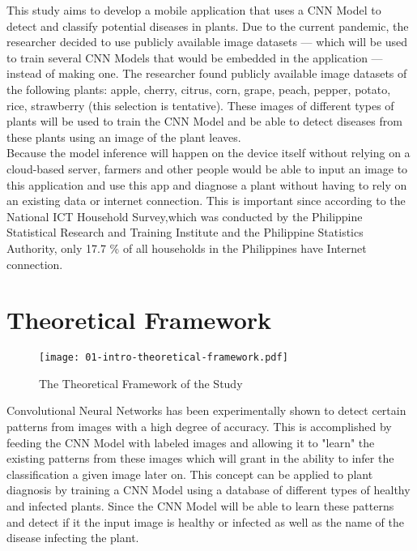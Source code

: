 
This study aims to develop a mobile application that uses a 
CNN Model  to detect and classify potential diseases in 
plants. Due to the current pandemic, the researcher decided to use publicly 
available image datasets — which will be used to train several CNN Models 
that would be embedded in the application — instead of making one. The researcher 
found publicly available image datasets of the following plants:
apple, cherry, citrus, corn, grape, peach, pepper, potato,
rice, strawberry (this selection is tentative). These images of different types 
of plants will be used to train the CNN Model and be able to detect diseases from 
these plants using an image of the plant leaves. \\ 

Because the model inference will
happen on the device itself without relying on a cloud-based server, 
farmers and other people would be able to input an image to this application 
and use this app and diagnose a plant without having to rely on an 
existing data or internet connection. This is important since according to 
the  National ICT Household Survey,which was conducted by the Philippine Statistical 
Research and Training Institute and the Philippine Statistics Authority, only 
17.7 \% of all households in the Philippines have Internet connection. 


\newpage 


\section{Theoretical Framework}

\begin{figure}[h!]
      \centering
      \texttt{[image: 01-intro-theoretical-framework.pdf]}
      \caption{The Theoretical Framework of the Study}
\end{figure}

Convolutional Neural Networks has been experimentally shown 
to detect certain patterns from images with a high degree of 
accuracy. This is accomplished 
by feeding the CNN Model with labeled images and allowing it to "learn"
the existing patterns from these images which will grant in the ability 
to infer the classification a given image later on. This concept 
can be applied to plant diagnosis by training a CNN Model using a database 
of different types of healthy and infected plants. Since the CNN Model 
will be able to learn these patterns and detect if it the input image is 
healthy or infected as well as the name of the disease infecting the plant. \\


